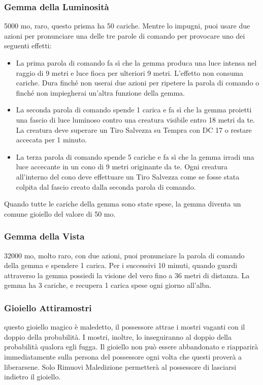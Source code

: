 \begin{multicols}{2}
	\subsubsection*{Gemma della Luminosità}
	5000 mo, raro, questo prisma ha 50 cariche. Mentre lo impugni, puoi usare due azioni per pronunciare una delle tre parole di comando per provocare uno dei seguenti effetti:

	\begin{itemize}
		\item
		La prima parola di comando fa sì che la gemma produca una luce intensa nel raggio di 9 metri e luce fioca per ulteriori 9 metri. L'effetto non consuma cariche. Dura finché non userai due azioni per ripetere la parola di comando o finché non impiegherai un'altra funzione della gemma.

		\item
		La seconda parola di comando spende 1 carica e fa sì che la gemma proietti una fascio di luce luminoso contro una creatura visibile entro 18 metri da te. La creatura deve superare un Tiro Salvezza su Tempra con DC 17 o restare accecata per 1 minuto.

		\item
		La terza parola di comando spende 5 cariche e fa sì che la gemma irradi una luce accecante in un cono di 9 metri originante da te. Ogni creatura all'interno del cono deve effettuare un Tiro Salvezza come se fosse stata colpita dal fascio creato dalla seconda parola di comando.

	\end{itemize}

	\medskip

	Quando tutte le cariche della gemma sono state spese, la gemma diventa un comune gioiello del valore di 50 mo.

	\subsubsection*{Gemma della Vista}
	32000 mo, molto raro, con due azioni, puoi pronunciare la parola di comando della gemma e spendere 1 carica. Per i successivi 10 minuti, quando guardi attraverso la gemma possiedi la visione del vero fino a 36 metri di distanza. La gemma ha 3 cariche, e recupera 1 carica spese ogni giorno all'alba.

	\subsubsection*{Gioiello Attiramostri}
	questo gioiello magico è maledetto, il possessore attrae i mostri vaganti con il doppio della probabilità. I mostri, inoltre, lo inseguiranno al doppio della probabilità qualora egli fugga. Il gioiello non può essere abbandonato e riapparirà immediatamente sulla persona del possessore ogni volta che questi proverà a liberarsene. Solo Rimuovi Maledizione permetterà al possessore di lasciarsi indietro il gioiello.


\end{multicols}
